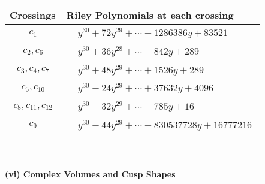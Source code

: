 \documentclass[1p]{elsarticle_modified}
\theoremstyle{definition}
\begin{document}
\begin{tabular}{m{50pt}|m{274pt}}
Crossings & \hspace{64pt}Riley Polynomials at each crossing \\
\hline $$\begin{aligned}c_{1}\end{aligned}$$&$\begin{aligned}
&y^{30}+72 y^{29}+\cdots-1286386 y+83521
\end{aligned}$\\
\hline $$\begin{aligned}c_{2},c_{6}\end{aligned}$$&$\begin{aligned}
&y^{30}+36 y^{28}+\cdots-842 y+289
\end{aligned}$\\
\hline $$\begin{aligned}c_{3},c_{4},c_{7}\end{aligned}$$&$\begin{aligned}
&y^{30}+48 y^{29}+\cdots+1526 y+289
\end{aligned}$\\
\hline $$\begin{aligned}c_{5},c_{10}\end{aligned}$$&$\begin{aligned}
&y^{30}-24 y^{29}+\cdots+37632 y+4096
\end{aligned}$\\
\hline $$\begin{aligned}c_{8},c_{11},c_{12}\end{aligned}$$&$\begin{aligned}
&y^{30}-32 y^{29}+\cdots-785 y+16
\end{aligned}$\\
\hline $$\begin{aligned}c_{9}\end{aligned}$$&$\begin{aligned}
&y^{30}-44 y^{29}+\cdots-830537728 y+16777216
\end{aligned}$\\
\hline
\end{tabular}\\~\\
\newpage\flushleft \textbf{(vi) Complex Volumes and Cusp Shapes}
\end{document}
